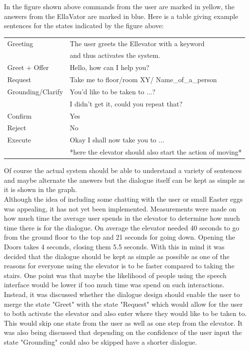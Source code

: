 \documentclass[a4paper, 12pt]{article}
\begin{document}
In the figure shown above commands from the user are marked in yellow, the answers from the EllaVator are marked in blue.
Here is a table giving example sentences for the states indicated by the figure above: \\


\begin{tabular}{|ll|}
  \hline
  Greeting & The user greets the Ellevator with a keyword \\
    & and thus activates the system.  \\
  Greet + Offer & Hello, how can I help you? \\
  Request & Take me to floor/room XY/ Name\_of\_a\_person \\
  Grounding/Clarify & You'd like to be taken to ...?\\ 
   & I didn't get it, could you repeat that? \\
  Confirm & Yes \\
  Reject & No \\
  Execute & Okay I shall now take you to ... \\ 
   & *here the elevator should also start the action of moving* \\
  \hline 
\end{tabular}
\newline
Of course the actual system should be able to understand a variety of sentences and maybe alternate the answers but the dialogue itself can be kept as simple as it is shown in the graph.  \\

Although the idea of including some chatting with the user or small Easter eggs was appealing, it has not yet been implemented.
Measurements were made on how much time the average user spends in the elevator to determine how much time there is for the dialogue.
On average the elevator needed 40 seconds to go from the ground floor to the top and 21 seconds for going down. Opening the Doors takes 4 seconds, closing them 5.5 seconds.
With this in mind it was decided that the dialogue should be kept as simple as possible as one of the reasons for everyone using the elevator is to be faster compared to taking the stairs.
One point was that maybe the likelihood of people using the speech interface would be lower if too much time was spend on such interactions.\\

Instead, it was discussed whether the dialogue design should enable the user to merge the state "Greet" with the state "Request" which would allow for the user to both activate the elevator and also enter where they would like to be taken to.
This would skip one state from the user as well as one step from the elevator.
It was also being discussed that depending on the confidence of the user input the state "Grounding" could also be skipped have a shorter dialogue.\\
\end{document}
